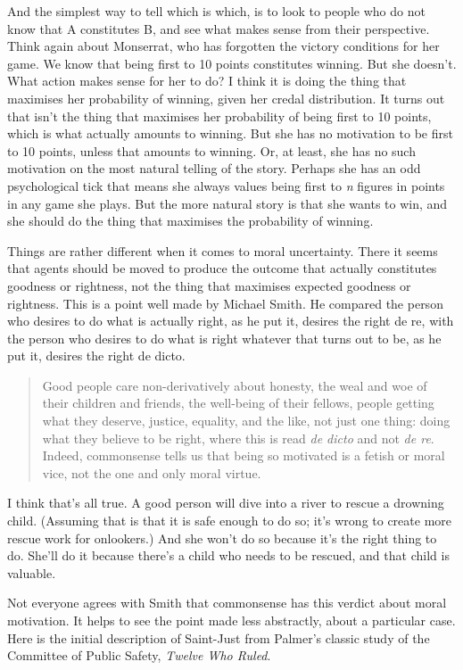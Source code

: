 And the simplest way to tell which is which, is to look to people who do not know that A constitutes B, and see what makes sense from their perspective. Think again about \gls{Monserrat}, who has forgotten the victory conditions for her game. We know that being first to 10 points constitutes winning. But she doesn't. What action makes sense for her to do? I think it is doing the thing that maximises her probability of winning, given her credal distribution. It turns out that isn't the thing that maximises her probability of being first to 10 points, which is what actually amounts to winning. But she has no motivation to be first to 10 points, unless that amounts to winning. Or, at least, she has no such motivation on the most natural telling of the story. Perhaps she has an odd psychological tick that means she always values being first to \emph{n} figures in points in any game she plays. But the more natural story is that she wants to win, and she should do the thing that maximises the probability of winning.

Things are rather different when it comes to moral uncertainty. There it seems that agents should be moved to produce the outcome that actually constitutes goodness or rightness, not the thing that maximises expected goodness or rightness. This is a point well made by Michael Smith. He compared the person who desires to do what is actually right, as he put it, desires the right de re, with the person who desires to do what is right whatever that turns out to be, as he put it, desires the right de dicto.

\begin{quote}
Good people care non-derivatively about honesty, the weal and woe of their children and friends, the well-being of their fellows, people getting what they deserve, justice, equality, and the like, not just one thing: doing what they believe to be right, where this is read \emph{de dicto} and not \emph{de re}. Indeed, commonsense tells us that being so motivated is a fetish or moral vice, not the one and only moral virtue. ~\citep[75]{Smith1994}
\end{quote}
I think that's all true. A good person will dive into a river to rescue a drowning child. (Assuming that is that it is safe enough to do so; it's wrong to create more rescue work for onlookers.) And she won't do so because it's the right thing to do. She'll do it because there's a child who needs to be rescued, and that child is valuable.

Not everyone agrees with Smith that commonsense has this verdict about moral motivation. It helps to see the point made less abstractly, about a particular case. Here is the initial description of \gls{Saint-Just} from Palmer's classic study of the Committee of Public Safety, \emph{Twelve Who Ruled}.

